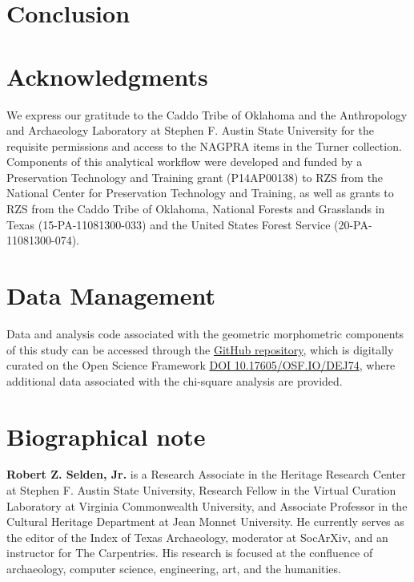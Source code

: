 \documentclass[review]{elsarticle}
\begin{document}
\section*{Conclusion}



\section*{Acknowledgments}

We express our gratitude to the Caddo Tribe of Oklahoma and the Anthropology and Archaeology Laboratory at Stephen F. Austin State University for the requisite permissions and access to the NAGPRA items in the Turner collection. Components of this analytical workflow were developed and funded by a Preservation Technology and Training grant (P14AP00138) to RZS from the National Center for Preservation Technology and Training, as well as grants to RZS from the Caddo Tribe of Oklahoma, National Forests and Grasslands in Texas (15-PA-11081300-033) and the United States Forest Service (20-PA-11081300-074).

\section*{Data Management}

Data and analysis code associated with the geometric morphometric components of this study can be accessed through the \href{https://github.com/aksel-blaise/perdiz}{GitHub repository}, which is digitally curated on the Open Science Framework \href{https://osf.io/dej74/}{DOI 10.17605/OSF.IO/DEJ74}, where additional data associated with the chi-square analysis are provided.

\section*{Biographical note}

\textbf{Robert Z. Selden, Jr.} is a Research Associate in the Heritage Research Center at Stephen F. Austin State University, Research Fellow in the Virtual Curation Laboratory at Virginia Commonwealth University, and Associate Professor in the Cultural Heritage Department at Jean Monnet University. He currently serves as the editor of the Index of Texas Archaeology, moderator at SocArXiv, and an instructor for The Carpentries. His research is focused at the confluence of archaeology, computer science, engineering, art, and the humanities.
\end{document}
